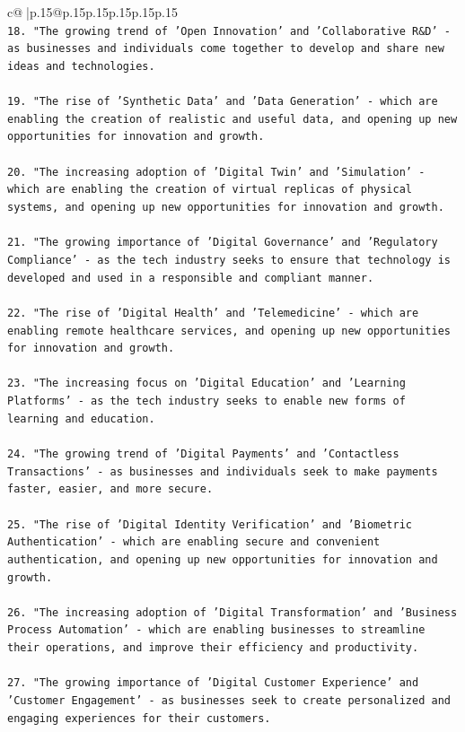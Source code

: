 \documentclass{article}
\begin{document}
{\begin{supertabular}{c@{$\;$}|p{.15\linewidth}@{}p{.15\linewidth}p{.15\linewidth}p{.15\linewidth}p{.15\linewidth}p{.15\linewidth}}
{{{\\ 
\texttt{18. "The growing trend of 'Open Innovation' and 'Collaborative R\&D' {-} as businesses and individuals come together to develop and share new ideas and technologies.} \\
\\ 
\texttt{19. "The rise of 'Synthetic Data' and 'Data Generation' {-} which are enabling the creation of realistic and useful data, and opening up new opportunities for innovation and growth.} \\
\\ 
\texttt{20. "The increasing adoption of 'Digital Twin' and 'Simulation' {-} which are enabling the creation of virtual replicas of physical systems, and opening up new opportunities for innovation and growth.} \\
\\ 
\texttt{21. "The growing importance of 'Digital Governance' and 'Regulatory Compliance' {-} as the tech industry seeks to ensure that technology is developed and used in a responsible and compliant manner.} \\
\\ 
\texttt{22. "The rise of 'Digital Health' and 'Telemedicine' {-} which are enabling remote healthcare services, and opening up new opportunities for innovation and growth.} \\
\\ 
\texttt{23. "The increasing focus on 'Digital Education' and 'Learning Platforms' {-} as the tech industry seeks to enable new forms of learning and education.} \\
\\ 
\texttt{24. "The growing trend of 'Digital Payments' and 'Contactless Transactions' {-} as businesses and individuals seek to make payments faster, easier, and more secure.} \\
\\ 
\texttt{25. "The rise of 'Digital Identity Verification' and 'Biometric Authentication' {-} which are enabling secure and convenient authentication, and opening up new opportunities for innovation and growth.} \\
\\ 
\texttt{26. "The increasing adoption of 'Digital Transformation' and 'Business Process Automation' {-} which are enabling businesses to streamline their operations, and improve their efficiency and productivity.} \\
\\ 
\texttt{27. "The growing importance of 'Digital Customer Experience' and 'Customer Engagement' {-} as businesses seek to create personalized and engaging experiences for their customers.} \\
}}}
\end{supertabular}}
\end{document}

